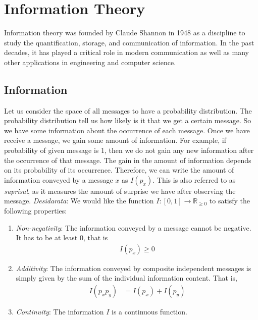 \documentclass[a4paper, 12pt]{book} %
\begin{document}
\chapter{Information Theory}
Information theory was founded by Claude Shannon in 1948 as a discipline to study the quantification, storage, and communication of information. In the past decades, it has played a critical role in modern communication as well as many other applications in engineering and computer science.  


\section{Information}
Let us consider the space of all messages to have a probability distribution. The probability distribution tell us how likely is it that we get a certain message. So we have some information about the occurrence of each message. Once we have receive a message, we gain some amount of information. For example, if probability of given message is 1, then we do not gain any new information after the occurrence of that message. The gain in the amount of information depends on its probability of its occurrence. Therefore, we can write the amount of information conveyed by a message $x$ as $I(p_x)$. This is also referred to as \emph{suprisal}, as it measures the amount of surprise we have after observing the message. \emph{Desidarata}: We would like the function $I: [0,1] \longrightarrow \mathbb{R}_{\geq 0}$ to satisfy the following properties:
\begin{enumerate}
    \item \emph{Non-negativity}: The information conveyed by a message cannot be negative. It has to be at least 0, that is
    \begin{align}
        I(p_x) \geq 0
    \end{align}
    \item \emph{Additivity}: The information conveyed by composite independent messages is simply given by the sum of the individual information content. That is,
    \begin{align}
        I(p_x p_y) &= I(p_x) + I(p_y)
    \end{align}
    \item \emph{Continuity}: The information $I$ is a continuous function.
\end{enumerate}
\end{document}
